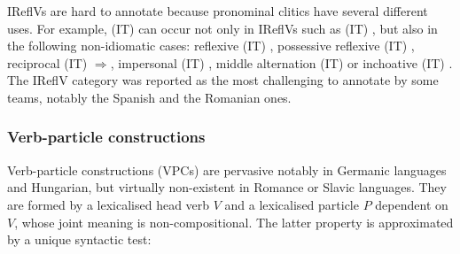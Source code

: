 \documentclass[output=paper,
modfonts,
]{langscibook}
\begin{document}
IReflVs are hard to annotate because pronominal clitics have several different uses. %
For example, %
(IT)  can occur not only in IReflVs such as (IT) , but also 
in the following non-idiomatic cases: reflexive (IT) , possessive reflexive (IT)  , reciprocal (IT)  $\Rightarrow$, impersonal (IT) ,  middle alternation (IT)  or inchoative (IT) . 
The IReflV category was reported as the most challenging to annotate by some teams, notably the Spanish and the Romanian ones.

\subsubsection{Verb-particle constructions}
\label{sec:vpcs}
%
Verb-particle constructions (VPCs) are pervasive notably in Germanic languages and Hungarian, but virtually non-existent in Romance or Slavic languages. They are formed by a lexicalised head verb $V$ and a lexicalised particle $P$ dependent on $V$, whose joint meaning is non-compositional. The latter property is approximated by a unique syntactic test:

\end{document}
